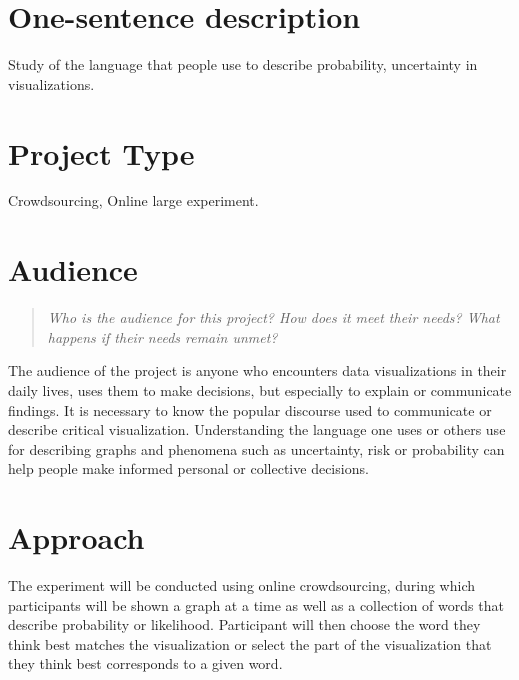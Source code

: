 \documentclass{proc}
\begin{document}

\section{One-sentence description}
Study of the language that people use to describe probability, uncertainty in visualizations.

\section{Project Type}
Crowdsourcing, Online large experiment.

\section{Audience} 
\begin{quote}
\textit{Who is the audience for this project? 
How does it meet their needs? 
What happens if their needs remain unmet?}
\end{quote}
The audience of the project is anyone who encounters data visualizations in their daily lives, uses them to make decisions, but especially to explain or communicate findings. It is necessary to know the popular discourse used to communicate or describe critical visualization. Understanding the language one uses or others use for describing graphs and phenomena such as uncertainty, risk or probability can help people make informed personal or collective decisions. %

\section{Approach}
The experiment will be conducted using online crowdsourcing, during which participants will be shown a graph at a time as well as a collection of words that describe probability or likelihood. Participant will then choose the word they think best matches the visualization or select the part of the visualization that they think best corresponds to a given word. 
\end{document}
